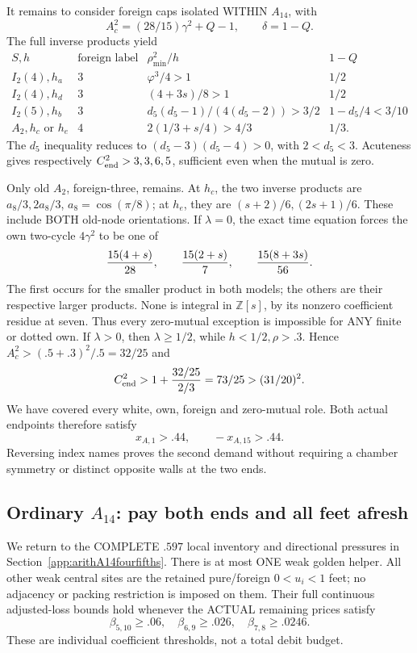 \documentclass[11pt]{article}
\begin{document}
It remains to consider foreign caps isolated
WITHIN \(A_{14}\), with
\[
                 A_c^2=(28/15)\gamma^2+Q-1,\qquad \delta=1-Q .
\]
The full inverse products yield
\[
 \begin{array}{c|c|c|c}
 S,h&\text{foreign label}&\rho_{\min}^2/h&1-Q\\ \hline
 I_2(4),h_a&3&\varphi^3/4>1&1/2\\
 I_2(4),h_d&3&(4+3s)/8>1&1/2\\
 I_2(5),h_b&3&d_5(d_5-1)/(4(d_5-2))>3/2&1-d_5/4<3/10\\
 A_2,h_c\text{ or }h_e&4&2(1/3+s/4)>4/3&1/3 .
 \end{array}
\]
The \(d_5\) inequality reduces to
\((d_5-3)(d_5-4)>0\), with \(2<d_5<3\).
Acuteness gives respectively
\(C_{\rm end}^2>3,3,6,5\), sufficient
even when the mutual is zero.

Only old \(A_2\), foreign-three, remains.
At \(h_c\), the two inverse products are
\(a_8/3,2a_8/3\), \(a_8=\cos(\pi/8)\);
at \(h_e\), they are
\((s+2)/6,(2s+1)/6\).
These include BOTH old-node orientations.
If \(\lambda=0\), the exact time equation
forces the own two-cycle \(4\gamma^2\)
to be one of
\[
                  {15(4+s)\over28},\qquad
                  {15(2+s)\over7},\qquad
                  {15(8+3s)\over56}.
\]
The first occurs for the smaller product
in both models; the others are their
respective larger products.
None is integral in \(\mathbb Z[s]\),
by its nonzero coefficient residue at seven.
Thus every zero-mutual exception is impossible
for ANY finite or dotted own.
If \(\lambda>0\), then \(\lambda\ge1/2\),
while \(h<1/2,\rho>.3\).
Hence \(A_c^2>(.5+.3)^2/.5=32/25\) and
\[
                    C_{\rm end}^2>
                      1+{32/25\over2/3}=73/25>(31/20)^2 .
\]
We have covered every white, own, foreign
and zero-mutual role.
Both actual endpoints therefore satisfy
\[
                     x_{A,1}>.44,\qquad -x_{A,15}>.44 .
\tag{A14ordends}\label{eq:arithA14ordinaryendpoint}
\]
Reversing index names proves the second
demand without requiring a chamber symmetry
or distinct opposite walls at the two ends.

\subsection{Ordinary \(A_{14}\): pay both ends and all feet afresh}
\label{app:arithA14ordinarycomposition}

We return to the COMPLETE \(.597\) local
inventory and directional pressures in
Section~\ref{app:arithA14fourfifths}.
There is at most ONE weak golden helper.
All other weak central sites are the
retained pure/foreign \(0<u_i<1\) feet;
no adjacency or packing restriction is
imposed on them.
Their full continuous adjusted-loss bounds
hold whenever the ACTUAL remaining prices
satisfy
\[
             \beta_{5,10}\ge.06,\quad
             \beta_{6,9}\ge.026,\quad
             \beta_{7,8}\ge.0246 .
\]
These are individual coefficient thresholds,
not a total debit budget.
\end{document}
